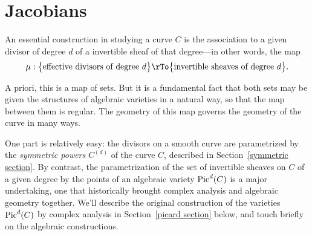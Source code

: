 

\chapter{Jacobians}\label{new Jacobians chapter}

%
%
%
%


An essential construction in studying a curve $C$ is the association to a given divisor of degree $d$ of a invertible sheaf of that degree---in other words, the map
$$
\mu : \big\{ \text{effective divisors of degree } d \big\} \rTo \big\{ \text{invertible sheaves of degree } d \big\}.
$$

A priori, this is a map of sets. But it is a fundamental fact that both sets may  be given the structures of  algebraic varieties in a natural way, so that the map between them is regular. The geometry of this map governs the geometry of the curve in many ways.

One part is relatively easy: the divisors on a smooth curve are parametrized by the \emph{symmetric powers} $C^{(d)}$ of the curve $C$, described in Section~\ref{symmetric section}. By contrast, the parametrization of the set of invertible sheaves on $C$ of a given degree by the points of an algebraic variety $\operatorname{Pic}^d(C)$ is a major undertaking, one that historically brought complex analysis and algebraic geometry together. We'll describe the original construction of the varieties $\operatorname{Pic}^d(C)$ by complex analysis in Section~\ref{picard section} below, and touch briefly on the algebraic constructions.

